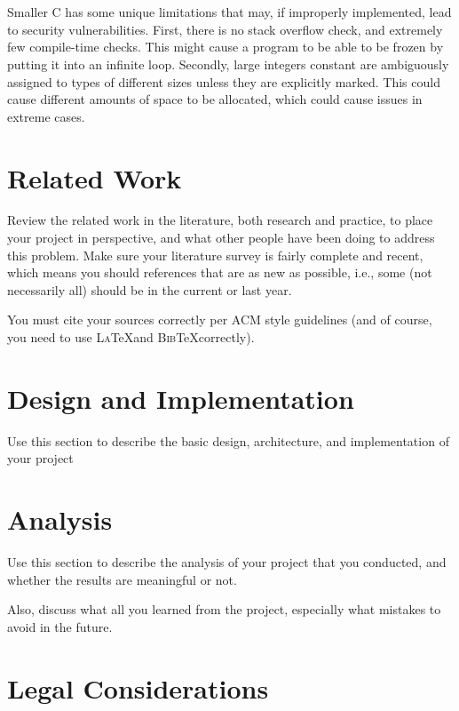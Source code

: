 \documentclass[sigconf, anonymous]{acmart}
\def\BibTeX{\textsc{Bib}\TeX}
\def\LaTeX{\textsc{La}\TeX}
\begin{document}
\\\\
Smaller C has some unique limitations that may, if improperly implemented, lead to security vulnerabilities. First, there is no stack overflow check, and extremely few compile-time checks. This might cause a program to be able to be frozen by putting it into an infinite loop. Secondly, large integers constant are ambiguously assigned to types of different sizes unless they are explicitly marked. This could cause different amounts of space to be allocated, which could cause issues in extreme cases.

\section{Related Work}
\label{related work}

Review the related work in the literature, both research and practice,
to place your project in perspective, and what other people have been
doing to address this problem. Make sure your literature survey is
fairly complete and recent, which means you should references that are
as new as possible, i.e., some (not necessarily all) should be in the
current or last year.

You must cite your sources correctly per ACM style guidelines (and of
course, you need to use \LaTeX and \BibTeX correctly).

\section{Design and Implementation}
\label{design}

Use this section to describe the basic design, architecture, and
implementation of your project

\section{Analysis}
\label{analysis}
Use this section to describe the analysis of your project that you
conducted, and whether the results are meaningful or not.

Also, discuss what all you learned from the project, especially what
mistakes to avoid in the future.

\section{Legal Considerations}
\label{legal considerations}
\end{document}
